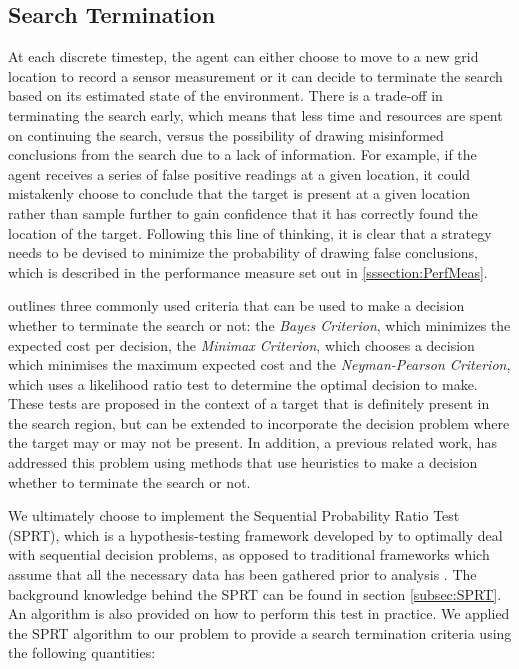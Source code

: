 
\subsection{Search Termination}\label{subsubsec:SeachTerminationMethodology}

At each discrete timestep, the agent can either choose to move to a new grid location to record a sensor measurement or it can decide to terminate the search based on its estimated state of the environment. There is a trade-off in terminating the search early, which means that less time and resources are spent on continuing the search, versus the possibility of drawing misinformed conclusions from the search due to a lack of information. For example, if the agent receives a series of false positive readings at a given location, it could mistakenly choose to conclude that the target is present at a given location rather than sample further to gain confidence that it has correctly found the location of the target. Following this line of thinking, it is clear that a strategy needs to be devised to minimize the probability of drawing false conclusions, which is described in the performance measure set out in \ref{sssection:PerfMeas}.\par
\cite{Pollock1971SearchInterfaces} outlines three commonly used criteria that can be used to make a decision whether to terminate the search or not: the \textit{Bayes Criterion}, which minimizes the expected cost per decision, the \textit{Minimax Criterion}, which chooses a decision which minimises the maximum expected cost and the \textit{Neyman-Pearson Criterion}, which uses a likelihood ratio test to determine the optimal decision to make. These tests are proposed in the context of a target that is definitely present in the search region, but can be extended to incorporate the decision problem where the target may or may not be present. In addition, a previous related work, \cite{Chung2007ASearchb} has addressed this problem using methods that use heuristics to make a decision whether to terminate the search or not. 

We ultimately choose to implement the Sequential Probability Ratio Test (SPRT), which is a hypothesis-testing framework developed by \citeauthor{Wald1950BayesProblems} to optimally deal with sequential decision problems, as opposed to traditional frameworks which assume that all the necessary data has been gathered prior to analysis \cite{Wald1950BayesProblems}. The background knowledge behind the SPRT can be found in section \ref{subsec:SPRT}. An algorithm is also provided on how to perform this test in practice.
We applied the SPRT algorithm to our problem to provide a search termination criteria using the following quantities: 

